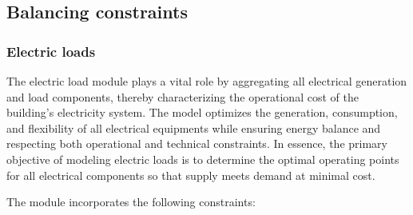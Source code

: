 \documentclass[11pt]{article}
\begin{document}
\subsection{Balancing constraints}

\subsubsection{Electric loads}
\label{sec:eload}

The electric load module plays a vital role by aggregating all electrical generation and load components, thereby characterizing the operational cost of the building’s electricity system. The model optimizes the generation, consumption, and flexibility of all electrical equipments while ensuring energy balance and respecting both operational and technical constraints. In essence, the primary objective of modeling electric loads is to determine the optimal operating points for all electrical components so that supply meets demand at minimal cost.

The module incorporates the following constraints:
\end{document}
